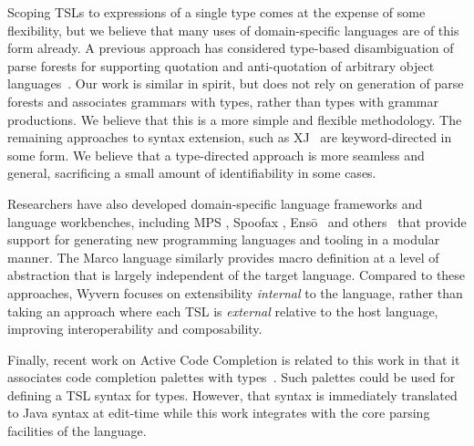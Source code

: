 Scoping TSLs to expressions of a single type comes at the expense of some flexibility, but we believe that many uses of domain-specific languages are of this form already. A previous approach has considered type-based disambiguation of parse forests for supporting quotation and anti-quotation of arbitrary object languages~\cite{bravenboer2005generalized}. Our work is similar in spirit, but does not rely on generation of parse forests and associates grammars with types, rather than types with grammar productions. We believe that this is a more simple and flexible methodology. The remaining approaches to syntax extension, such as XJ~\cite{DBLP:conf/scam/ClarkSW08} are keyword-directed in some form. We believe that a type-directed approach is more seamless and general, sacrificing a small amount of identifiability in some cases.

Researchers have also developed domain-specific language frameworks and language workbenches, including MPS \cite{mps}, Spoofax \cite{KatsVisser2010}, Ens\={o}~\cite{enso} and others~\cite{krahn2008monticore,van1992pregmatic} that provide support for generating new programming languages and tooling in a modular manner.  
The Marco language \cite{lee:2012:marco} similarly provides macro definition at a level of abstraction that is largely independent of the target language.
Compared to these approaches, Wyvern focuses on extensibility \emph{internal} to the language, rather than taking an approach where each TSL is \emph{external} relative to the host language, improving interoperability and composability.

Finally, recent work on Active Code Completion is related to this work in that it associates code completion palettes with types~\cite{omar2012active}. Such palettes could be used for defining a TSL syntax for types. However, that syntax is immediately translated to Java syntax at edit-time while this work integrates with the core parsing facilities of the language.



